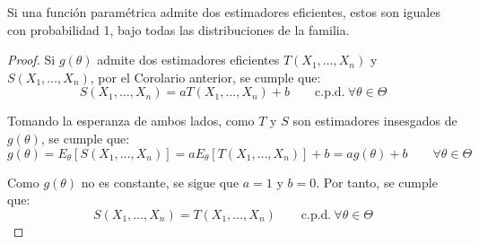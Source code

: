 \begin{coro}
    Si una función paramétrica admite dos estimadores eficientes, estos son iguales con probabilidad 1, bajo todas las distribuciones de la familia.
    \begin{proof}
        Si $g(\theta)$ admite dos estimadores eficientes $T(X_1, \ldots, X_n)$ y $S(X_1, \ldots, X_n)$, por el Corolario anterior, se cumple que:
        \begin{equation*}
            S(X_1, \ldots, X_n) = a T(X_1, \ldots, X_n) + b\qquad \text{c.p.d.} \ \forall \theta \in \Theta
        \end{equation*}

        Tomando la esperanza de ambos lados, como $T$ y $S$ son estimadores insesgados de $g(\theta)$, se cumple que:
        \begin{equation*}
            g(\theta) = E_\theta[S(X_1, \ldots, X_n)] = a E_\theta[T(X_1, \ldots, X_n)] + b = a g(\theta) + b\qquad \forall \theta \in \Theta
        \end{equation*}

        Como $g(\theta)$ no es constante, se sigue que $a = 1$ y $b = 0$. Por tanto, se cumple que:
        \begin{equation*}
            S(X_1, \ldots, X_n) = T(X_1, \ldots, X_n)\qquad \text{c.p.d.} \ \forall \theta \in \Theta
        \end{equation*}
    \end{proof}
\end{coro}

